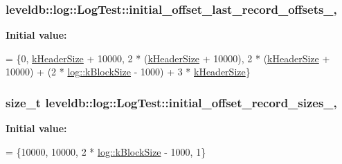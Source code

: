 \subsubsection[{initial\+\_\+offset\+\_\+last\+\_\+record\+\_\+offsets\+\_\+}]{ leveldb\+::log\+::\+Log\+Test\+::initial\+\_\+offset\+\_\+last\+\_\+record\+\_\+offsets\+\_\+\hspace{0.3cm}{\ttfamily [static]}, {\ttfamily [private]}}\label{classleveldb_1_1log_1_1_log_test_a291ccfe6639347ff67b6039974151b0d}
{\bfseries Initial value\+:}
\begin{DoxyCode}
=
    \{0,
     \hyperlink{namespaceleveldb_1_1log_a3771f9a7e5d0e9057d33fbfd371f7e83}{kHeaderSize} + 10000,
     2 * (\hyperlink{namespaceleveldb_1_1log_a3771f9a7e5d0e9057d33fbfd371f7e83}{kHeaderSize} + 10000),
     2 * (\hyperlink{namespaceleveldb_1_1log_a3771f9a7e5d0e9057d33fbfd371f7e83}{kHeaderSize} + 10000) +
         (2 * \hyperlink{namespaceleveldb_1_1log_a2daa4274b5fc09292a7d856072f379b2}{log::kBlockSize} - 1000) + 3 * \hyperlink{namespaceleveldb_1_1log_a3771f9a7e5d0e9057d33fbfd371f7e83}{kHeaderSize}\}
\end{DoxyCode}
\hypertarget{classleveldb_1_1log_1_1_log_test_a1c32fd131248b038f38d320558a6c211}{}
\subsubsection[{initial\+\_\+offset\+\_\+record\+\_\+sizes\+\_\+}]{\setlength{\rightskip}{0pt plus 5cm}size\+\_\+t leveldb\+::log\+::\+Log\+Test\+::initial\+\_\+offset\+\_\+record\+\_\+sizes\+\_\+\hspace{0.3cm}{\ttfamily [static]}, {\ttfamily [private]}}\label{classleveldb_1_1log_1_1_log_test_a1c32fd131248b038f38d320558a6c211}
{\bfseries Initial value\+:}
\begin{DoxyCode}
=
    \{10000,  
     10000,
     2 * \hyperlink{namespaceleveldb_1_1log_a2daa4274b5fc09292a7d856072f379b2}{log::kBlockSize} - 1000,  
     1\}
\end{DoxyCode}
\hypertarget{classleveldb_1_1log_1_1_log_test_a7011f0308081ffe914c3b131948f06f5}{}

